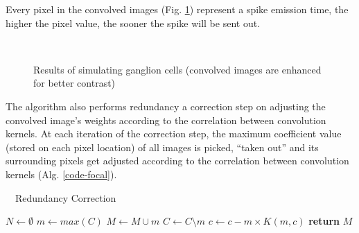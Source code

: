 Every pixel in the convolved images (Fig. \ref{fig-convolution-results}) 
represent a spike emission time, the higher the pixel value, the sooner the 
spike will be sent out.

\begin{figure}[hbt]
  \centering
  \\
  \caption{Results of simulating ganglion cells (convolved images are enhanced for better contrast)}
  \label{fig-convolution-results}
\end{figure}

The algorithm also performs redundancy a correction step on adjusting the 
convolved image's weights according to the correlation between convolution 
kernels. At each iteration of the correction step, the maximum coefficient  
value (stored on each pixel location) of all images is picked, ``taken out'' 
and its surrounding pixels get adjusted according to the correlation between 
convolution kernels (Alg. \ref{code-focal}).

\begin{algorithm}
  \caption{~~Redundancy Correction}
  \label{code-focal}
  \begin{algorithmic}
      \State $N \leftarrow \emptyset$ 
      \Repeat
        \State $m \leftarrow max(C)$
        \State $M \leftarrow M \cup m$
        \State $C \leftarrow C \setminus m$
         
           
            \State $c \leftarrow c - m \times K(m, c)$
          \EndIf
        \EndFor
      \State \textbf{return} $M$
    \EndProcedure
  \end{algorithmic}
\end{algorithm}


